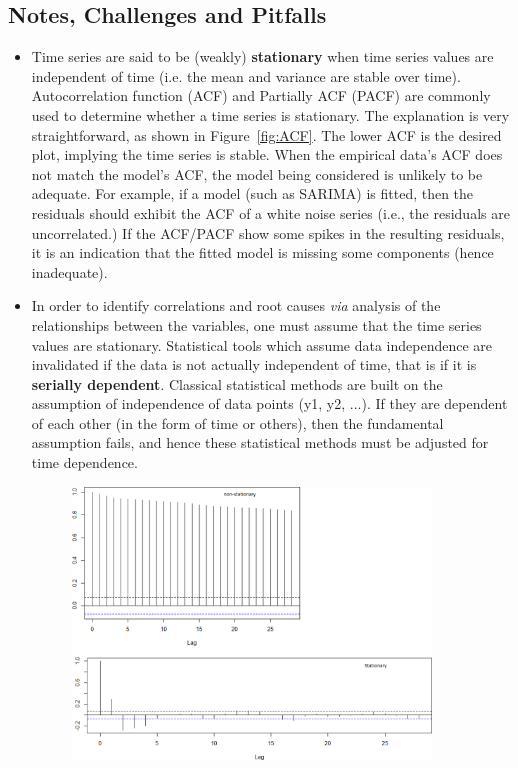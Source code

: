 \subsection{Notes, Challenges and Pitfalls}
 \begin{itemize}[noitemsep]
\item Time series are said to be (weakly) \textbf{stationary} when time series values are independent of time (i.e. the mean and variance are stable over time). Autocorrelation function (ACF) and Partially ACF (PACF) are commonly used to determine whether a time series is stationary. The explanation is very straightforward, as shown in Figure~\ref{fig:ACF}. The lower ACF is the desired plot, implying the time series is stable. When the empirical data's ACF does not match the model's ACF, the model being considered is unlikely to be adequate. For example, if a model (such as SARIMA) is fitted, then the residuals should exhibit the ACF of a white noise series (i.e., the residuals are uncorrelated.) If the ACF/PACF show some spikes in the resulting residuals, it is an indication that the fitted model is missing some components (hence inadequate).
\item In order to identify correlations and root causes \textit{via} analysis of the relationships between the variables, one must assume that the time series values are stationary. Statistical tools which assume data independence are invalidated if the data is not actually independent of time, that is if it is \textbf{serially dependent}. Classical statistical methods are built on the assumption of independence of data points (y1, y2, ...). If they are dependent of each other (in the form of time or others), then the fundamental assumption fails, and hence these statistical methods must be adjusted for time dependence.
\begin{figure}[t]
\centering
\includegraphics[width=0.90\textwidth]{Images/ACF_example.png}

\end{figure}
\end{itemize}
